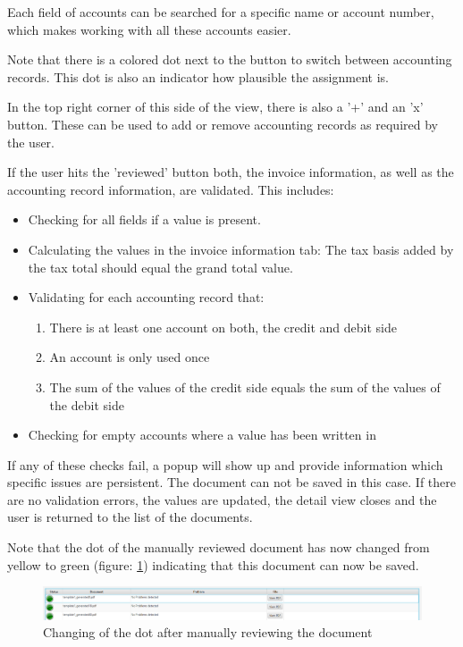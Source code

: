Each field of accounts can be searched for a specific name or account number, which makes working with all these accounts easier.

Note that there is a colored dot next to the button to switch between accounting records. This dot is also an indicator how plausible the assignment is. 

In the top right corner of this side of the view, there is also a '+' and an 'x' button. These can be used to add or remove accounting records as required by the user.

If the user hits the 'reviewed' button both, the invoice information, as well as the accounting record information, are validated. This includes:
\begin{itemize}
	\item Checking for all fields if a value is present.
	\item Calculating the values in the invoice information tab: The tax basis added by the tax total should equal the grand total value.
	\item Validating for each accounting record that:
		\begin{enumerate}
			\item There is at least one account on both, the credit and debit side
			\item An account is only used once
			\item The sum of the values of the credit side equals the sum of the values of the debit side
		\end{enumerate}
	\item Checking for empty accounts where a value has been written in
\end{itemize}

If any of these checks fail, a popup will show up and provide information which specific issues are persistent. The document can not be saved in this case. If there are no validation errors, the values are updated, the detail view closes and the user is returned to the list of the documents.

Note that the dot of the manually reviewed document has now changed from yellow to green (figure: \ref{greenAfterReview}) indicating that this document can now be saved.

\begin{figure}[ht!]
\centering
\includegraphics[scale=0.6]{Images/GUI/greenAfterReview.png}
\caption{Changing of the dot after manually reviewing the document \label{greenAfterReview}}
\end{figure}

